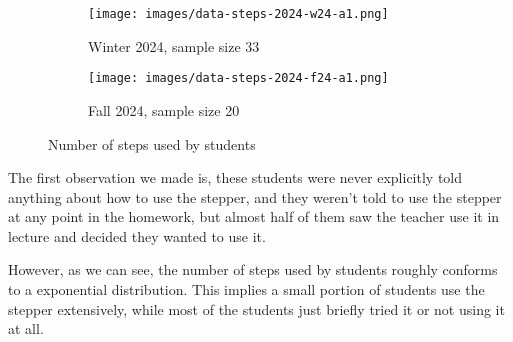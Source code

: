 \begin{figure}[ht]
  \centering
  \begin{minipage}{.40\linewidth}
    \begin{subfigure}{\linewidth}
      \texttt{[image: images/data-steps-2024-w24-a1.png]}
      \caption{Winter 2024, sample size 33}
      \label{fig:eval-num-steps-w24}
    \end{subfigure}
  \end{minipage}
  \quad
  \begin{minipage}{.40\linewidth}
    \begin{subfigure}{\linewidth}
      \texttt{[image: images/data-steps-2024-f24-a1.png]}
      \caption{Fall 2024, sample size 20}
      \label{fig:eval-num-steps-f24}
    \end{subfigure}
  \end{minipage}
  \caption{Number of steps used by students}
  \label{fig:eval-num-steps}
\end{figure}

The first observation we made is, these students were never explicitly
told anything about how to use the stepper, and they weren't told to
use the stepper at any point in the homework, but almost half of them
saw the teacher use it in lecture and decided they wanted to use it.

However, as we can see, the number of steps used by students roughly
conforms to a exponential distribution. This implies a small portion
of students use the stepper extensively, while most of the students
just briefly tried it or not using it at all.

